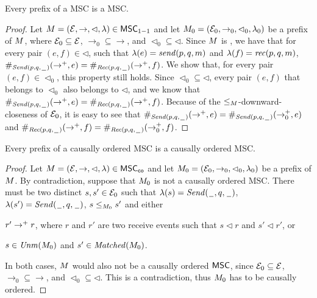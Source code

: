 \begin{lemma}
	\label{lem:p2p-prefix}
	Every prefix of a \pp MSC is a \pp MSC.
\end{lemma}
\begin{proof}
Let $\msc = (\Events, \procrel, \lhd, \lambda) \in \ppMSCs$ and let $\msc_0 =
(\Events_0, \procrel_0, \lhd_0, \lambda_0)$ be a prefix of $\msc$, where $\Events_0 \subseteq \Events$, ${\rightarrow_0} \subseteq {\rightarrow}$, and ${\lhd_0} \subseteq {\lhd}$. Since $\msc$ is \pp, we have that for every pair $(e,f) \in {\lhd}$, such that $\lambda(e) = \sact{p}{q}{\msg}$ and $\lambda(f) = \ract{p}{q}{\msg}$, $\sametype{e}{\pqsAct{p}{q}}{\procrel^+} = \sametype{f}{\pqrAct{p}{q}}{\procrel^+}$. We show that, for every pair $(e,f) \in {\lhd_0}$, this property still holds. 
Since  ${\lhd_0} \subseteq {\lhd}$, every pair $(e,f)$ that belongs to $\lhd_0$ also belongs to $\lhd$, and we know that $\sametype{e}{\pqsAct{p}{q}}{\procrel^+} = \sametype{f}{\pqrAct{p}{q}}{\procrel^+}$. 
Because of the $\le_\msc$-downward-closeness of $\Events_0$, it is easy to see that $\sametype{e}{\pqsAct{p}{q}}{\procrel^+}=\sametype{e}{\pqsAct{p}{q}}{\procrel_0^+}$ and $\sametype{f}{\pqrAct{p}{q}}{\procrel^+}=\sametype{f}{\pqrAct{p}{q}}{\procrel_0^+}$.
\end{proof}

\begin{lemma}
\label{lem:co-prefix}
Every prefix of a causally ordered MSC is a causally ordered MSC.
\end{lemma}
\begin{proof}
Let $\msc = (\Events, \procrel, \lhd, \lambda) \in \coMSCs$ and let $\msc_0 =
(\Events_0, \procrel_0, \lhd_0, \lambda_0)$ be a prefix of $\msc$. By contradiction, suppose that $\msc_0$ is not a	causally ordered MSC. There must be two distinct $s,s' \in \Events_0$ such that $\lambda(s)=\pqsAct{\plh}{q}$, $\lambda(s')=\pqsAct{\plh}{q}$, $s \le_{\msc_0} s'$ and either
\begin{enumerate*}[label={(\roman*)}]
	\item $r' \procrel^+ r$, where $r$ and $r'$ are two receive events such that $s \lhd r$ and $s' \lhd r'$, or
	\item $s \in \Unm{\msc_0}$ and $s' \in \Matched{\msc_0}$.
\end{enumerate*}
In both cases, $\msc$ would also not be a causally ordered $\MSCs$, since $\Events_0 \subseteq \Events$, ${\rightarrow_0} \subseteq {\rightarrow}$, and ${\lhd_0} \subseteq {\lhd}$. This is a contradiction, thus $\msc_0$ has to be causally ordered.
\end{proof}

